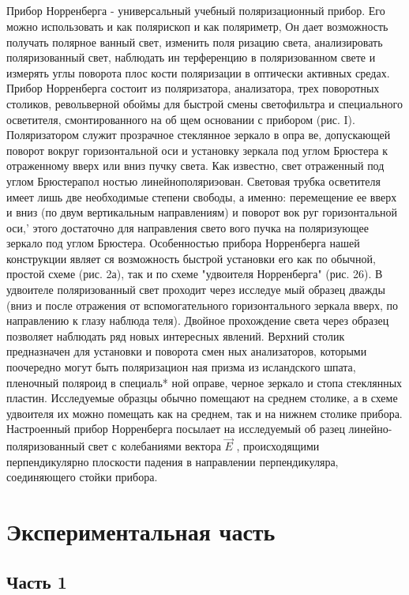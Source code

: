 \subsection{}
Прибор Норренберга - универсальный учебный поляризационный
прибор. Его можно использовать и как полярископ и как поляриметр,
Он дает возможность получать полярное ванный свет, изменить поля­
ризацию света, анализировать поляризованный свет, наблюдать ин­
терференцию в поляризованном свете и измерять углы поворота плос­
кости поляризации в оптически активных средах.
Прибор Норренберга состоит из поляризатора, анализатора,
трех поворотных столиков, револьверной обоймы для быстрой смены
светофильтра и специального осветителя, смонтированного на об­
щем основании с прибором (рис. I).
Поляризатором служит прозрачное стеклянное зеркало в опра­
ве, допускающей поворот вокруг горизонтальной оси и установку
зеркала под углом Брюстера к отраженному вверх или вниз пучку
света. Как известно, свет отраженный под углом Брюстерапол­
ностью линейнополяриэован. Световая трубка осветителя имеет
лишь две необходимые степени свободы, а именно: перемещение ее
вверх и вниз (по двум вертикальным направлениям) и поворот вок­
руг горизонтальной оси,' этого достаточно для направления свето­
вого пучка на поляризующее зеркало под углом Брюстера.
Особенностью прибора Норренберга нашей конструкции являет­
ся возможность быстрой установки его как по обычной, простой
схеме (рис. 2а), так и по схеме "удвоителя Норренберга" (рис.
26). В удвоителе поляризованный свет проходит через исследуе­
мый образец дважды (вниз и после отражения от вспомогательного
горизонтального зеркала вверх, по направлению к глазу наблюда­
теля). Двойное прохождение света через образец позволяет наблюдать
ряд новых интересных явлений.
Верхний столик предназначен для установки и поворота смен­
ных анализаторов, которыми поочередно могут быть поляризацион­
ная призма из исландского шпата, пленочный поляроид в специаль*
ной оправе, черное зеркало и стопа стеклянных пластин.
Исследуемые образцы обычно помещают на среднем столике, а
в схеме удвоителя их можно помещать как на среднем, так и на
нижнем столике прибора.
Настроенный прибор Норренберга посылает на исследуемый об­
разец линейно-поляризованный свет с колебаниями вектора $\vec{E}$ ,
происходящими перпендикулярно плоскости падения в направлении
перпендикуляра, соединяющего стойки прибора.
\section{Экспериментальная часть}
\subsection{Часть 1}
